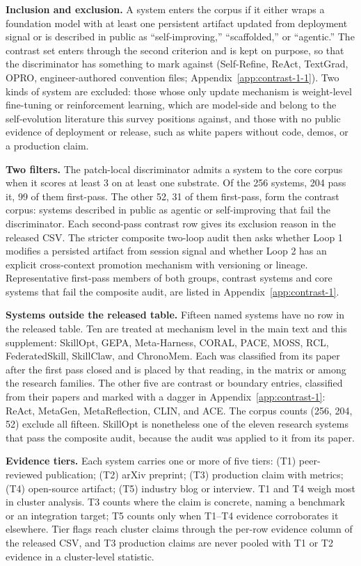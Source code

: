\documentclass[
  11pt,
]{article}
\newcounter{none} %
\begin{document}
\textbf{Inclusion and exclusion.} A system enters the corpus if it either wraps a foundation model with at least one persistent artifact updated from deployment signal or is described in public as ``self-improving,'' ``scaffolded,'' or ``agentic.'' The contrast set enters through the second criterion and is kept on purpose, so that the discriminator has something to mark against (Self-Refine, ReAct, TextGrad, OPRO, engineer-authored convention files; Appendix~\ref{app:contrast-1-1}). Two kinds of system are excluded: those whose only update mechanism is weight-level fine-tuning or reinforcement learning, which are model-side and belong to the self-evolution literature this survey positions against, and those with no public evidence of deployment or release, such as white papers without code, demos, or a production claim.

\textbf{Two filters.} The patch-local discriminator admits a system to the core corpus when it scores at least 3 on at least one substrate. Of the 256 systems, 204 pass it, 99 of them first-pass. The other 52, 31 of them first-pass, form the contrast corpus: systems described in public as agentic or self-improving that fail the discriminator. Each second-pass contrast row gives its exclusion reason in the released CSV. The stricter composite two-loop audit then asks whether Loop 1 modifies a persisted artifact from session signal and whether Loop 2 has an explicit cross-context promotion mechanism with versioning or lineage. Representative first-pass members of both groups, contrast systems and core systems that fail the composite audit, are listed in Appendix~\ref{app:contrast-1}.

\textbf{Systems outside the released table.} Fifteen named systems have no row in the released table. Ten are treated at mechanism level in the main text and this supplement: SkillOpt, GEPA, Meta-Harness, CORAL, PACE, MOSS, RCL, FederatedSkill, SkillClaw, and ChronoMem. Each was classified from its paper after the first pass closed and is placed by that reading, in the matrix or among the research families. The other five are contrast or boundary entries, classified from their papers and marked with a dagger in Appendix~\ref{app:contrast-1}: ReAct, MetaGen, MetaReflection, CLIN, and ACE. The corpus counts (256, 204, 52) exclude all fifteen. SkillOpt is nonetheless one of the eleven research systems that pass the composite audit, because the audit was applied to it from its paper.

\textbf{Evidence tiers.} Each system carries one or more of five tiers: (T1) peer-reviewed publication; (T2) arXiv preprint; (T3) production claim with metrics; (T4) open-source artifact; (T5) industry blog or interview. T1 and T4 weigh most in cluster analysis. T3 counts where the claim is concrete, naming a benchmark or an integration target; T5 counts only when T1--T4 evidence corroborates it elsewhere. Tier flags reach cluster claims through the per-row evidence column of the released CSV, and T3 production claims are never pooled with T1 or T2 evidence in a cluster-level statistic.
\end{document}
